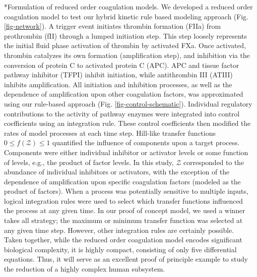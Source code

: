 \documentclass[12pt]{article}
\makeatletter
\renewcommand\subsection{\@startsection
	{subsection}{2}{0mm}
	{-0.05in}
	{-0.5\baselineskip}
	{\normalfont\normalsize\bfseries}}
\makeatother
\begin{document}


\subsection*{Formulation of reduced order coagulation models.}
We developed a reduced order coagulation model to test our hybrid kinetic rule based modeling approach (Fig. \ref{fig-network}).
A trigger event initiates thrombin formation (FIIa) from prothrombin (fII) through a lumped initiation step.
This step loosely represents the initial fluid phase activation of thrombin by activated FXa.
Once activated, thrombin catalyzes its own formation (amplification step), and inhibition via the conversion of protein C to activated protein C (APC).
APC and tissue factor pathway inhibitor (TFPI) inhibit initiation, while antithrombin III (ATIII) inhibits amplification. 
All initiation and inhibition processes, as well as the dependence of amplification upon other coagulation factors, was approximated using our rule-based approach (Fig. \ref{fig-control-schematic}). 
Individual regulatory contributions to the activity of pathway enzymes were integrated into control coefficients using an integration rule.  
These control coefficients then modified the rates of model processes at each time step.
Hill-like transfer functions $0 \leq f\left(\mathcal{Z}\right) \leq 1$ quantified the influence of components upon a target process. 
Components were either individual inhibitor or activator levels or some function of levels, e.g., the product of factor levels. 
In this study, $\mathcal{Z}$ corresponded to the abundance of individual inhibitors or activators, 
with the exception of the dependence of amplification upon specific coagulation factors (modeled as the product of factors). 
When a process was potentially sensitive to multiple inputs, logical integration rules were used to select which transfer functions influenced the process at any given time. 
In our proof of concept model, we used a winner takes all strategy; the maximum or minimum transfer function was selected at any given time step. 
However, other integration rules are certainly possible. 
Taken together, while the reduced order coagulation model encodes significant biological complexity, it is highly compact, consisting of only five differential equations. 
Thus, it will serve as an excellent proof of principle example to study the reduction of a highly complex human subsystem.  
\end{document}
